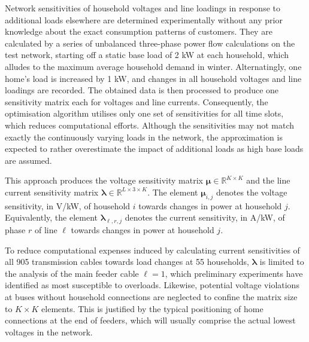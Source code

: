
Network sensitivities of household voltages and line loadings in response to additional loads elsewhere are determined experimentally without any prior knowledge about the exact consumption patterns of customers. They are calculated by a series of unbalanced three-phase power flow calculations on the test network, starting off a static base load of 2 kW at each household, which alludes to the maximum average household demand in winter. Alternatingly, one home's load is increased by 1 kW, and changes in all household voltages and line loadings are recorded. The obtained data is then processed to produce one sensitivity matrix each for voltages and line currents. Consequently, the optimisation algorithm utilises only one set of sensitivities for all time slots, which reduces computational efforts. Although the sensitivities may not match exactly the continuously varying loads in the network, the approximation is expected to rather overestimate the impact of additional loads as high base loads are assumed.

This approach produces the voltage sensitivity matrix  $\bm{\mu} \in \mathbb{R}^{K \times K}$ and the line current sensitivity matrix $\bm{\lambda} \in \mathbb{R}^{L\times 3 \times K}$. The element $\bm{\mu}_{i,j}$ denotes the voltage sensitivity, in V/kW, of household $i$ towards changes in power at household $j$. Equivalently, the element $\bm{\lambda}_{\ell,r,j}$ denotes the current sensitivity, in A/kW, of phase $r$ of line $\ell$ towards changes in power at household $j$.

To reduce computational expenses induced by calculating current sensitivities of all 905 transmission cables towards load changes at 55 households, $\bm{\lambda}$ is limited to the analysis of the main feeder cable $\ell = 1$, which preliminary experiments have identified as most susceptible to overloads. Likewise, potential voltage violations at buses without household connections are neglected to confine the matrix size to $K\times K$ elements. This is justified by the typical positioning of home connections at the end of feeders, which will usually comprise the actual lowest voltages in the network.

